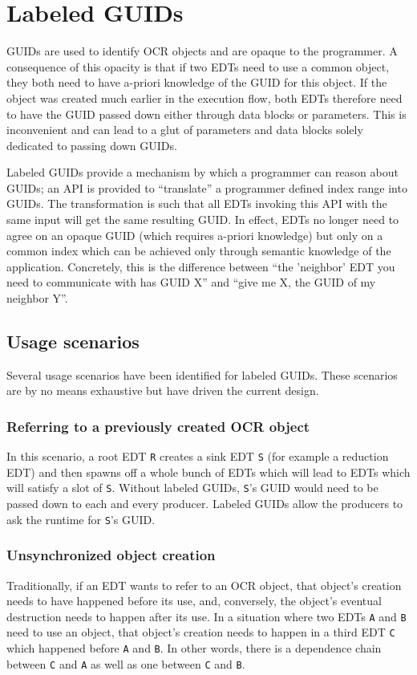 \section{Labeled GUIDs}
GUIDs are used to identify OCR objects and are opaque to the
programmer. A consequence of this opacity is that if two EDTs need to
use a common object, they both need to have a-priori knowledge of the
GUID for this object. If the object was created much earlier in the
execution flow, both EDTs therefore need to have the GUID passed down
either through data blocks or parameters. This is inconvenient and can
lead to a glut of parameters and data blocks solely dedicated to
passing down GUIDs.

Labeled GUIDs provide a mechanism by which a programmer can
reason about GUIDs; an API is provided to ``translate'' a programmer
defined index range into GUIDs. The transformation is such that all
EDTs invoking this API with the same input will get the same resulting
GUID. In effect, EDTs no longer need to agree on an opaque GUID (which
requires a-priori knowledge) but only on a common index which can be
achieved only through semantic knowledge of the
application. Concretely, this is the difference between ``the
'neighbor' EDT you need to communicate with has GUID X'' and
``give me X, the GUID of my neighbor Y''.
\subsection{Usage scenarios}
Several usage scenarios have been identified for labeled GUIDs. These
scenarios are by no means exhaustive but have driven the current
design.
\subsubsection{Referring to a previously created OCR object}
In this scenario, a root EDT \texttt{R} creates a sink EDT \texttt{S}
(for example a reduction EDT) and then spawns off a whole bunch of
EDTs which will lead to EDTs which will satisfy a slot of
\texttt{S}. Without labeled GUIDs, \texttt{S}'s GUID would need to be
passed down to each and every producer. Labeled GUIDs allow the
producers to ask the runtime for \texttt{S}'s GUID.
\subsubsection{Unsynchronized object creation}
Traditionally, if an EDT wants to refer to an OCR object, that
object's creation needs to have happened before its use, and,
conversely, the object's eventual destruction needs to happen after
its use. In a situation where two EDTs \texttt{A} and \texttt{B}
need to use an object, that object's creation needs to happen in a
third EDT \texttt{C} which happened before \texttt{A} and
\texttt{B}. In other words, there is a dependence chain between
\texttt{C} and \texttt{A} as well as one between \texttt{C} and
\texttt{B}.

